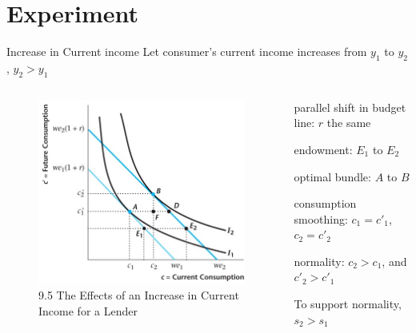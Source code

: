 \documentclass[11pt,aspectratio=169,usenames,dvipsnames]{beamer}
\let\tempone\itemize
\let\temptwo\enditemize
\renewenvironment{itemize}{\tempone\addtolength{\itemsep}{\fill}}{\temptwo}
\begin{document}
\section{Experiment}
\label{sec:Experiment}

\begin{frame}{Increase in Current income}
\label{slide:Increase_in_Current_income}
    Let consumer's \alert{current} income increases from $ y_1 $ to $ y_{2}$, $ y_{2} > y_{1} $
    \begin{columns}
        \begin{column}{0.5\textwidth}
            \begin{figure}
                \caption{\scriptsize 9.5  The Effects of an Increase in Current Income for a Lender}
                \includegraphics[width=.9\textwidth]{./figures/Figure9_5.jpg}
            \end{figure}
        \end{column}
        \begin{column}{0.5\textwidth}
            \begin{itemize}
                \item parallel shift in budget line: $ r $ the same
                \item endowment: $ E_{1} $ to $ E_{2} $
                \item optimal bundle: $ A $ to $ B $
                \item consumption smoothing: $c_{1} = c'_{1}$, $c_{2} = c'_{2}$
                \item normality: $ c_{2} > c_{1} $, and $ c'_{2} > c'_{1} $
                \item To support normality, $ s_{2} > s_{1} $
            \end{itemize}
        \end{column}
    \end{columns}
\end{frame}
\end{document}
